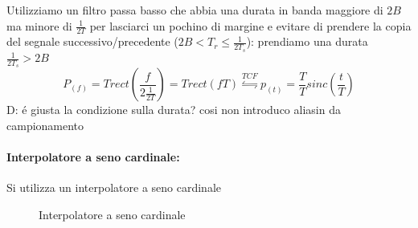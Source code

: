         Utilizziamo un filtro passa basso che abbia una durata in banda maggiore di $2B$ ma minore di $\frac{1}{2T}$  per lasciarci un pochino di margine e evitare  di prendere 
        la copia del segnale successivo/precedente ($2B<T_r\leq\frac{1}{2T_s}$): prendiamo una durata $\frac{1}{2T_s}>2B$
        \[
            P_{(f)} = T rect\left(\frac{f}{2\frac{1}{2T}}\right)= T rect\left(fT\right) \overset{TCF}{\leftrightharpoons} p_{(t)} = \frac{T}{T}sinc\left(\frac{t}{T}\right)
        \]
        {\color{red}D:} é giusta la condizione sulla durata? cosi non introduco aliasin da campionamento
        \paragraph{Interpolatore a seno cardinale:} Si utilizza un interpolatore a seno cardinale
            \begin{figure}[H]
                \centering
                \caption{Interpolatore a seno cardinale}
                \label{fig:interpolatore a seno cardinale}
            \end{figure}
